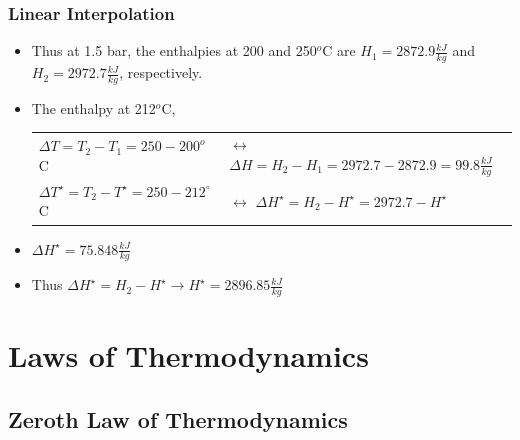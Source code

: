 \documentclass[10pt,compress]{beamer}
\begin{document}
\begin{frame}
  \frametitle{Linear Interpolation}
\noindent
\begin{itemize}
\item <2-> Thus at 1.5 bar, the enthalpies at 200 and 250$^{o}$C are $H_{1}=2872.9\frac{kJ}{kg}$ and $H_{2}=2972.7\frac{kJ}{kg}$, respectively.
\item <3-> The enthalpy at 212$^{o}$C,
\begin{tabular}{ l l }
\scriptsize $\Delta T=T_{2}-T_{1}=250-200^{o}$C   & \scriptsize $\longleftrightarrow$  $\Delta H=H_{2}-H_{1}=2972.7-2872.9=99.8\frac{kJ}{kg}$ \\
\scriptsize $\Delta T^{\star} = T_{2} - T^{\star}= 250 - 212^{\circ}$C & \scriptsize $\longleftrightarrow$  $\Delta H^{\star}= H_{2} - H^{\star}= 2972.7 - H^{\star}$\\    
\end{tabular}
\item <4-> $\Delta H^{\star}=75.848\frac{kJ}{kg}$ 
\item <5-> Thus $\Delta H^{\star}= H_{2}-H^{\star} \longrightarrow H^{\star}=2896.85\frac{kJ}{kg}$
\end{itemize}

\end{frame}



\section{Laws of Thermodynamics}


\subsection{Zeroth Law of Thermodynamics}
\end{document}
